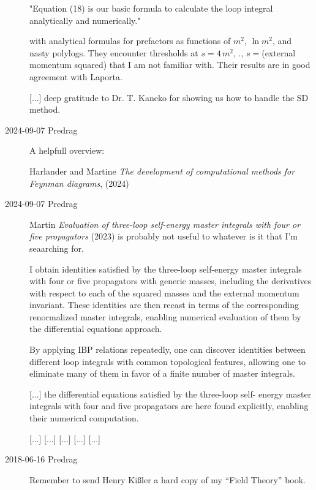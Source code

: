 \begin{description}
"Equation (18) is our basic formula to calculate
the loop integral analytically and numerically."

with analytical formulas for prefactors as functions of $m^2$,  $\ln m^2$,
and nasty polylogs.
They encounter thresholds at $s=4\,m^2$, \etc., $s=$(external momentum squared)
that I am not familiar with.
Their results are in good agreement with Laporta.

[...]
deep gratitude to Dr. T. Kaneko for showing us how to handle the SD method. 

\item[2024-09-07 Predrag] A helpfull overview:

Harlander and Martine
{\em The development of computational methods for {Feynman} diagrams},
(2024)

\item[2024-09-07 Predrag]
Martin
{\em Evaluation of three-loop self-energy master integrals with four or five propagators}
(2023) is probably not useful to whatever is it that I'm seaarching for.

I obtain identities satisfied by the three-loop self-energy master
integrals with four or five propagators with generic masses, including
the derivatives with respect to each of the squared masses and the
external momentum invariant. These identities are then recast in terms of
the corresponding renormalized master integrals, enabling
numerical evaluation of them by the differential equations approach.

By applying IBP relations repeatedly, %
one can discover identities between different loop integrals with
common topological features, allowing one to eliminate
many of them in favor of a finite number of master
integrals.

[...]
the differential equations satisfied by the three-loop self-
energy master integrals with four and five propagators are here
found explicitly, enabling their numerical computation.

[...]
[...]
[...]
[...]
[...]

\bigskip

\item[2018-06-16 Predrag]
Remember to send Henry Ki{\ss}ler a hard copy of my ``Field Theory''
book.


\end{description}


\printbibliography[heading=subbibintoc,title={References}]

